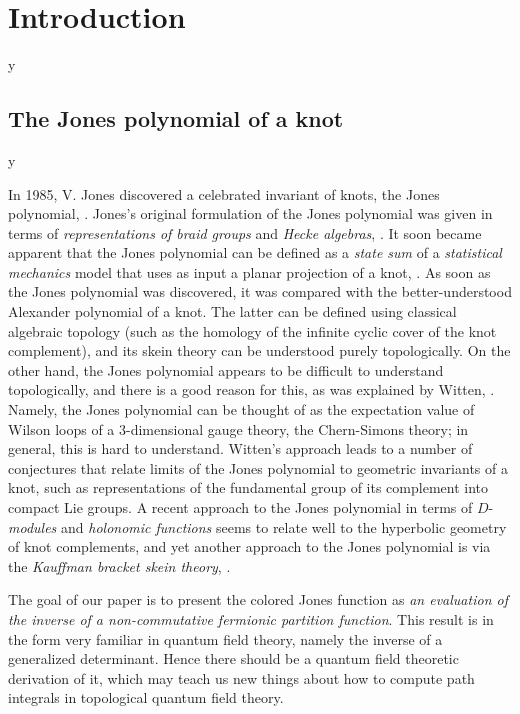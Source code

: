 \documentclass{amsart}
\theoremstyle{plain}
\theoremstyle{definition}
\theoremstyle{remark}
\def\printname#1{
        \if\draft y
                \smash{\makebox[0pt]{\hspace{-0.5in}
                        \raisebox{8pt}{\tt\tiny #1}}}
        \fi
}
\def\lbl#1{\label{#1}\printname{#1}}
\begin{document}
\maketitle

\tableofcontents




\section{Introduction}
\lbl{sec.intro}

\subsection{The Jones polynomial of a knot}
\lbl{sub.history}
In 1985, V. Jones discovered a celebrated invariant of knots, the Jones
polynomial, \cite{J1}. 
Jones's original formulation of the Jones polynomial was given in terms of
{\em representations of braid groups} and {\em Hecke algebras}, \cite{J1}. 
It soon
became apparent that the Jones polynomial can be defined as a {\em state sum} 
of a {\em statistical mechanics} model that uses as input a planar projection
of a knot, \cite{J2,Tu}.
As soon as the Jones polynomial was discovered, it was compared 
with the better-understood Alexander polynomial of a knot. The latter can be
defined using classical algebraic topology (such as the homology of 
the infinite cyclic cover of the knot complement), and its skein theory
can be understood purely topologically.
On the other hand, the Jones polynomial appears to be difficult to understand
topologically, and there is a good reason for this, as was explained by 
Witten, \cite{Wi}.
Namely, the Jones polynomial can be thought of as the expectation 
value of Wilson loops of a 3-dimensional gauge theory, the Chern-Simons theory;
 in general, this is hard to understand. Witten's approach leads to a number
of conjectures that relate limits of the Jones polynomial to geometric 
invariants of a knot, such as representations of the fundamental group
of its complement into compact Lie groups. 
A recent approach to the Jones polynomial 
in terms of $D$-{\em modules} and {\em holonomic functions} seems to relate 
well 
to the hyperbolic geometry of knot complements, \cite{GLe, Ga2} and
yet another approach to the Jones polynomial is via the {\em Kauffman bracket
skein theory}, \cite{KL}.

The goal of our paper is to present the colored Jones function
as {\em an evaluation of the inverse of a non-commutative fermionic partition 
function}.
 This result is in the form very familiar in quantum field theory, 
namely the inverse of
a generalized determinant.
Hence there should be a quantum field theoretic derivation of it, which may 
teach us new things about how to compute path integrals in topological 
quantum field theory.
\end{document}
